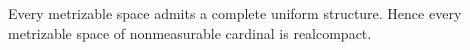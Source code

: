 Every metrizable space admits a complete uniform structure. Hence every metrizable space of nonmeasurable cardinal is realcompact.
